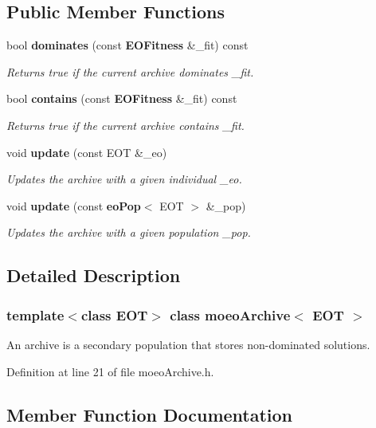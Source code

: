 \subsection*{Public Member Functions}
\begin{CompactItemize}
\item 
bool {\bf dominates} (const {\bf EOFitness} \&\_\-fit) const 
\begin{CompactList}\small\item\em Returns true if the current archive dominates \_\-fit. \item\end{CompactList}\item 
bool {\bf contains} (const {\bf EOFitness} \&\_\-fit) const 
\begin{CompactList}\small\item\em Returns true if the current archive contains \_\-fit. \item\end{CompactList}\item 
void {\bf update} (const EOT \&\_\-eo)
\begin{CompactList}\small\item\em Updates the archive with a given individual \_\-eo. \item\end{CompactList}\item 
void {\bf update} (const {\bf eo\-Pop}$<$ EOT $>$ \&\_\-pop)
\begin{CompactList}\small\item\em Updates the archive with a given population \_\-pop. \item\end{CompactList}\end{CompactItemize}


\subsection{Detailed Description}
\subsubsection*{template$<$class EOT$>$ class moeo\-Archive$<$ EOT $>$}

An archive is a secondary population that stores non-dominated solutions. 



Definition at line 21 of file moeo\-Archive.h.

\subsection{Member Function Documentation}

